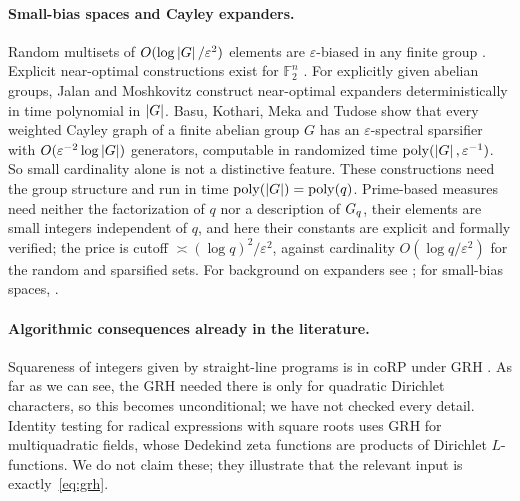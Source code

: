 \paragraph{Small-bias spaces and Cayley expanders.}
Random multisets of $O(\log\left\lvert G \right\rvert/\varepsilon^2)$ elements are $\varepsilon$-biased in any finite group
\cite{alonroichman1994}. Explicit near-optimal constructions exist for $\mathbb F_2^n$ \cite{tashma2017}. For
explicitly given abelian groups, Jalan and Moshkovitz \cite{jalanmoshkovitz2021} construct near-optimal
expanders deterministically in time polynomial in $\left\lvert G \right\rvert$. Basu, Kothari, Meka and Tudose
\cite{bkmt2026} show that every weighted Cayley graph of a finite abelian group $G$ has an $\varepsilon$-spectral sparsifier with
$O(\varepsilon^{-2}\log\left\lvert G \right\rvert)$ generators, computable in randomized time $\operatorname{poly}(\left\lvert G \right\rvert,\varepsilon^{-1})$. So small cardinality
alone is not a distinctive feature. These constructions need the group structure and run in time
$\operatorname{poly}(\left\lvert G \right\rvert)=\operatorname{poly}(q)$. Prime-based measures need neither the factorization of $q$ nor a description of
$G_q$, their elements are small integers independent of $q$, and here their constants are explicit and formally verified; the
price is cutoff $\asymp(\log q)^2/\varepsilon^2$, against cardinality $O(\log q/\varepsilon^2)$ for the random and sparsified sets. For
background on expanders see \cite{hlw2006}; for small-bias spaces, \cite{naornaor1993}.

\paragraph{Algorithmic consequences already in the literature.}
Squareness of integers given by straight-line programs is in coRP under GRH \cite{gaillardjindal2023}.
As far as we can see, the GRH needed there is only for quadratic Dirichlet characters, so this becomes
unconditional; we have not checked every detail.
Identity testing for radical expressions with square roots \cite{bnsw2022} uses GRH for multiquadratic
fields, whose Dedekind zeta functions are products of Dirichlet $L$-functions. We do not claim these;
they illustrate that the relevant input is exactly~\eqref{eq:grh}.
